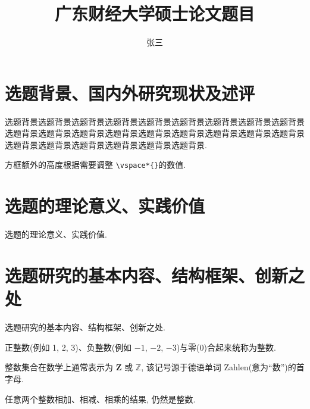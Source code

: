 \documentclass[type=proposal, twoside, AutoFakeBold=3.17,AutoFakeSlant=0.2,a4paper,openany]{gdufe_master}
\title{广东财经大学硕士论文题目}
\author{张三}
\begin{document}
% 
\makeProposalCover
\makeProposalNote
\ProposalMatter
\makeProposalInfoTable
\vspace*{-7.7pt}
\begin{tcolorbox}[proposalBoxStyle]
    \section{选题背景、国内外研究现状及述评}
    \indent\setlength{\parindent}{2em}
    选题背景选题背景选题背景选题背景选题背景选题背景选题背景选题背景选题背景选题背景选题背景选题背景选题背景选题背景选题背景选题背景选题背景选题背景选题背景选题背景选题背景选题背景选题背景选题背景.\cite{anon-cn1,anon-cn2,anon-cn3,anon-cn4,anon-cn5,anon-en1,anon-en2,anon-en3,anon-en4,anon-en5}

    方框额外的高度根据需要调整 \verb|\vspace*{}|的数值.
    \tcbline
    \section{选题的理论意义、实践价值}
    选题的理论意义、实践价值.
    \vspace*{4cm}
    \tcbline
    \section{选题研究的基本内容、结构框架、创新之处}
    选题研究的基本内容、结构框架、创新之处.

    \begin{definition}[整数]
        正整数(例如 1, 2, 3)、负整数(例如 ${-1}$, $-2$, $-3$)与零(0)合起来统称为{\heiti 整数}.
    \end{definition}

    \begin{remark}
        整数集合在数学上通常表示为 $\mathbf{Z}$ 或 $\mathbb{Z}$, 该记号源于德语单词 Zahlen(意为``数'')的首字母.
    \end{remark}

    \begin{property}
        任意两个整数相加、相减、相乘的结果, 仍然是整数.
    \end{property}


\end{tcolorbox}
\end{document}
